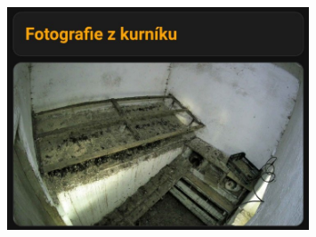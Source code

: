 \begin{figure}[H]
    \centering
    \includegraphics[width=0.8\textwidth]{img/foto_z_guarda}
    \label{fig:foto_z_guarda}
\end{figure}

%
